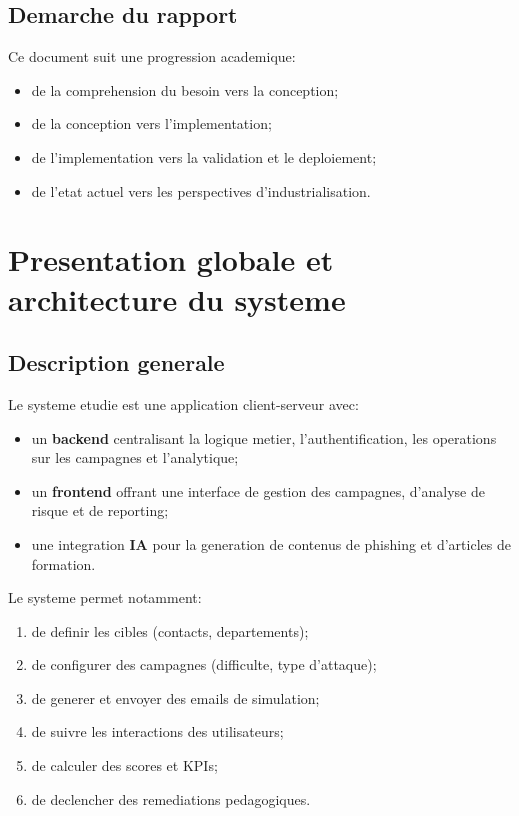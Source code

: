 \documentclass[12pt,a4paper,oneside]{report}
\begin{document}
\section{Demarche du rapport}
Ce document suit une progression academique:
\begin{itemize}[leftmargin=1.2cm]
  \item de la comprehension du besoin vers la conception;
  \item de la conception vers l'implementation;
  \item de l'implementation vers la validation et le deploiement;
  \item de l'etat actuel vers les perspectives d'industrialisation.
\end{itemize}

\chapter{Presentation globale et architecture du systeme}

\section{Description generale}
Le systeme etudie est une application client-serveur avec:
\begin{itemize}[leftmargin=1.2cm]
  \item un \textbf{backend} centralisant la logique metier, l'authentification, les operations sur les campagnes et l'analytique;
  \item un \textbf{frontend} offrant une interface de gestion des campagnes, d'analyse de risque et de reporting;
  \item une integration \textbf{IA} pour la generation de contenus de phishing et d'articles de formation.
\end{itemize}

Le systeme permet notamment:
\begin{enumerate}[leftmargin=1.2cm]
  \item de definir les cibles (contacts, departements);
  \item de configurer des campagnes (difficulte, type d'attaque);
  \item de generer et envoyer des emails de simulation;
  \item de suivre les interactions des utilisateurs;
  \item de calculer des scores et KPIs;
  \item de declencher des remediations pedagogiques.
\end{enumerate}
\end{document}
